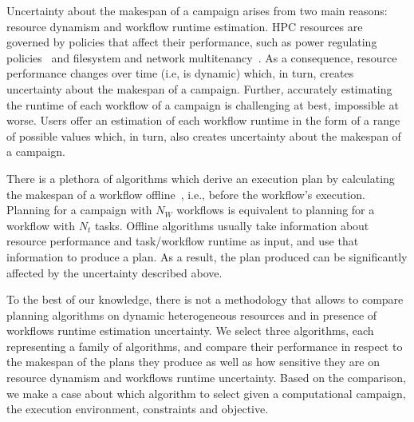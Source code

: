 
Uncertainty about the makespan of a campaign arises from two main reasons:
resource dynamism and workflow runtime estimation. HPC resources are governed by
policies that affect their performance, such as power regulating
policies~\cite{inadomi2015analyzing} and filesystem and network
multitenancy~\cite{brown2018interference}. As a consequence, resource
performance changes over time (i.e, is dynamic) which, in turn, creates
uncertainty about the makespan of a campaign. Further, accurately estimating the
runtime of each workflow of a campaign is challenging at best, impossible at
worse. Users offer an estimation of each workflow runtime in the form of a range
of possible values which, in turn, also creates uncertainty about the makespan
of a campaign.

There is a plethora of algorithms which derive an execution plan by calculating
the makespan of a workflow offline~\cite{lu2019review}, i.e., before the
workflow's execution. Planning for a campaign with $N_W$ workflows is equivalent
to planning for a workflow with $N_t$ tasks. Offline algorithms usually take
information about resource performance and task/workflow runtime as input, and
use that information to produce a plan. As a result, the plan produced can be
significantly affected by the uncertainty described above.

To the best of our knowledge, there is not a methodology that allows to compare
planning algorithms on dynamic heterogeneous resources and in presence of
workflows runtime estimation uncertainty. We select three algorithms, each
representing a family of algorithms, and compare their performance in respect to
the makespan of the plans they produce as well as how sensitive they are on
resource dynamism and workflows runtime uncertainty. Based on the comparison, we
make a case about which algorithm to select given a computational campaign, the
execution environment, constraints and objective.

